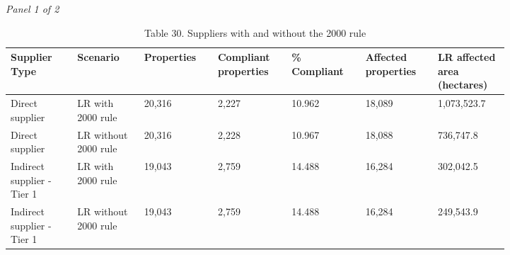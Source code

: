 \documentclass[12pt]{article}
\begin{document}
\begin{landscape}
\begin{table}[H]
\centering
\caption{Table 30. Suppliers with and without the 2000 rule}
\textit{Panel 1 of 2}\\[2pt]
{\fontsize{12}{14}\selectfont
\setlength{\tabcolsep}{3pt}
\renewcommand{\arraystretch}{1.08}
\begin{tabular}{p{0.117\linewidth}p{0.117\linewidth}p{0.117\linewidth}p{0.117\linewidth}p{0.117\linewidth}p{0.117\linewidth}p{0.117\linewidth}}
\toprule
Supplier Type & Scenario & Properties & Compliant properties & \% Compliant & Affected properties & LR affected area (hectares) \\
\midrule
Direct supplier & LR with 2000 rule & 20,316 & 2,227 & 10.962 & 18,089 & 1,073,523.7 \\
Direct supplier & LR without 2000 rule & 20,316 & 2,228 & 10.967 & 18,088 & 736,747.8 \\
Indirect supplier - Tier 1 & LR with 2000 rule & 19,043 & 2,759 & 14.488 & 16,284 & 302,042.5 \\
Indirect supplier - Tier 1 & LR without 2000 rule & 19,043 & 2,759 & 14.488 & 16,284 & 249,543.9 \\
\bottomrule
\end{tabular}
}

\vspace{0.6em}


\end{table}
\end{landscape}
\end{document}

